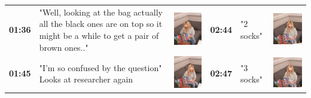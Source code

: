 \documentclass[twocolumn, issue, empirical, authordate,drafn]{jote-new-article}
\begin{document}
\begin{table}[ht!]
\begin{fullwidth}
\begin{tabularx}{\linewidth}{@{} m{.05\linewidth} m{.28\linewidth} >{\raggedleft\arraybackslash}m{.1\linewidth}  m{.05\linewidth} m{.28\linewidth} >{\raggedleft\arraybackslash}m{.1\linewidth} @{}}
\textbf{01:36} & "Well, looking at the bag actually all the black ones are on top so it might be a while to get a pair of brown ones.." & \includegraphics[height=.09\textheight, valign=t]{media/image18.png} &
 \textbf{02:44} & "2 socks" & \includegraphics[height=.09\textheight, valign=t]{media/image26.png} \\ 
 
\textbf{01:45} & "I'm so confused by the question" Looks at researcher again & \includegraphics[height=.09\textheight, valign=t]{media/image19.png} &
  \textbf{02:47} & "3 socks" & \includegraphics[height=.09\textheight, valign=t]{media/image27.png} \\ 


\end{tabularx}
\end{fullwidth}
\end{table}
\end{document}
